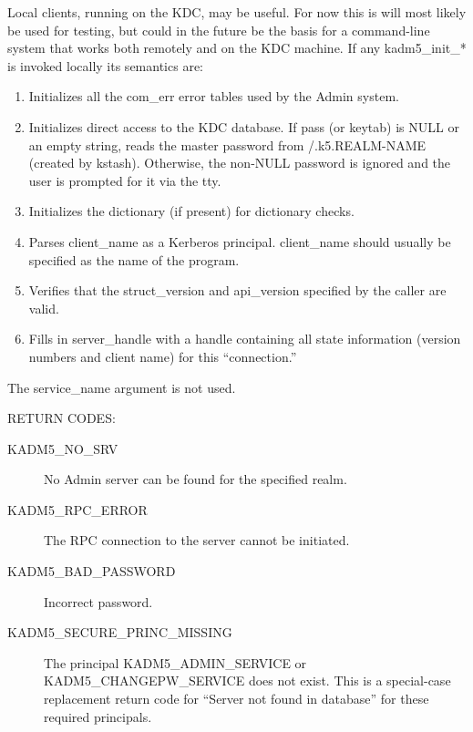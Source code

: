 Local clients, running on the KDC, may be useful. For now this is will
most likely be used for testing, but could in the future be the basis
for a command-line system that works both remotely and on the KDC
machine.  If any kadm5_init_* is invoked locally its semantics are:

\begin{enumerate}
\item Initializes all the com_err error tables used by the Admin
system.

\item Initializes direct access to the KDC database.  If pass (or
keytab) is NULL or an empty string, reads the master password from
/.k5.REALM-NAME (created by kstash).  Otherwise, the non-NULL password
is ignored and the user is prompted for it via the tty.

\item Initializes the dictionary (if present) for dictionary checks.

\item Parses client_name as a Kerberos principal.  client_name should
usually be specified as the name of the program.

\item Verifies that the struct_version and api_version specified by
the caller are valid.

\item Fills in server_handle with a handle containing all state
information (version numbers and client name) for this ``connection.''
\end{enumerate}
The service_name argument is not used.

RETURN CODES: 

\begin{description}
\item[KADM5_NO_SRV] No Admin server can be found for the
specified realm.

\item[KADM5_RPC_ERROR] The RPC connection to the server cannot be
initiated.

\item[KADM5_BAD_PASSWORD] Incorrect password.

\item[KADM5_SECURE_PRINC_MISSING] The principal
KADM5_ADMIN_SERVICE or KADM5_CHANGEPW_SERVICE does not
exist.  This is a special-case replacement return code for ``Server
not found in database'' for these required principals.

\end{description}

